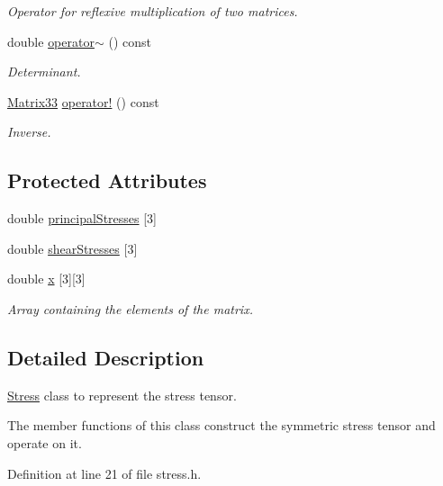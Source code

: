 \begin{DoxyCompactItemize}
\begin{DoxyCompactList}\small\item\em \-Operator for reflexive multiplication of two matrices. \end{DoxyCompactList}\item 
double \hyperlink{classMatrix33_a15b37caa6ab0d9f4a9f0d95846abd675}{operator$\sim$} () const 
\begin{DoxyCompactList}\small\item\em \-Determinant. \end{DoxyCompactList}\item 
\hyperlink{classMatrix33}{\-Matrix33} \hyperlink{classMatrix33_a1b822a20343a26b3c9bb7fd5c1247f37}{operator!} () const 
\begin{DoxyCompactList}\small\item\em \-Inverse. \end{DoxyCompactList}\end{DoxyCompactItemize}
\subsection*{\-Protected \-Attributes}
\begin{DoxyCompactItemize}
\item 
double \hyperlink{classStress_aea8c3e40aa59a89d7ba79d2c916050a6}{principal\-Stresses} \mbox{[}3\mbox{]}
\item 
double \hyperlink{classStress_a77e8705e56c2fb56826a638edf3f78bf}{shear\-Stresses} \mbox{[}3\mbox{]}
\item 
double \hyperlink{classMatrix33_af7f01fa466616eb7c8eda2e4d9f85cdd}{x} \mbox{[}3\mbox{]}\mbox{[}3\mbox{]}
\begin{DoxyCompactList}\small\item\em \-Array containing the elements of the matrix. \end{DoxyCompactList}\end{DoxyCompactItemize}


\subsection{\-Detailed \-Description}
\hyperlink{classStress}{\-Stress} class to represent the stress tensor. 

\-The member functions of this class construct the symmetric stress tensor and operate on it. 

\-Definition at line 21 of file stress.\-h.



